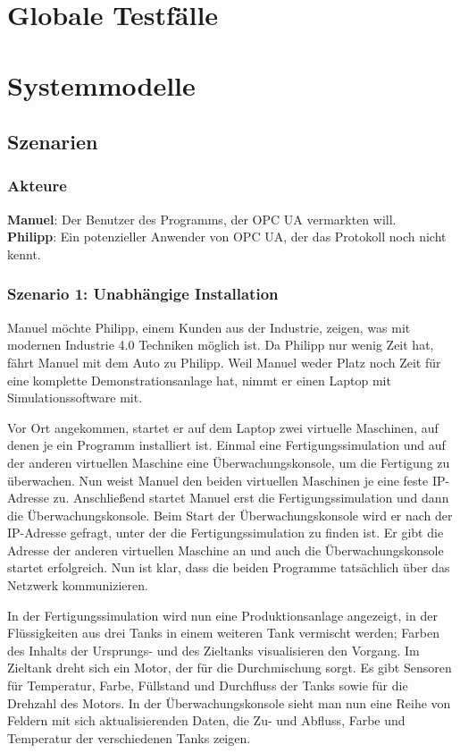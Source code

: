 \documentclass[parskip=full]{scrartcl}
\begin{document}
\pagebreak
\section{Globale Testfälle}
\Blindtext[1]

\pagebreak
\section{Systemmodelle}
\subsection{Szenarien}
\subsubsection*{Akteure}
\textbf{Manuel}: Der Benutzer des Programms, der OPC UA vermarkten will.\\
\textbf{Philipp}: Ein potenzieller Anwender von OPC UA, der das Protokoll noch nicht kennt.

\subsubsection{Szenario 1: Unabhängige Installation}
Manuel möchte Philipp, einem Kunden aus der Industrie, zeigen, was mit modernen Industrie 4.0 Techniken möglich ist.
Da Philipp nur wenig Zeit hat, fährt Manuel mit dem Auto zu Philipp. Weil Manuel weder Platz 
noch Zeit für eine komplette Demonstrationsanlage hat, nimmt er einen Laptop mit Simulationssoftware mit.

Vor Ort angekommen, startet er auf dem Laptop zwei virtuelle Maschinen, auf denen je ein Programm installiert ist. 
Einmal eine Fertigungssimulation und auf der anderen virtuellen Maschine eine Überwachungskonsole, um die Fertigung zu überwachen.
Nun weist Manuel den beiden virtuellen Maschinen je eine feste IP-Adresse zu.
Anschlie{\ss}end startet Manuel erst die Fertigungssimulation und dann die Überwachungskonsole.
Beim Start der Überwachungskonsole wird er nach der IP-Adresse gefragt, unter der die Fertigungssimulation zu finden ist. 
Er gibt die Adresse der anderen virtuellen Maschine an und auch die Überwachungskonsole startet erfolgreich. 
Nun ist klar, dass die beiden Programme tatsächlich über das Netzwerk kommunizieren.

In der Fertigungssimulation wird nun eine Produktionsanlage angezeigt, in der Flüssigkeiten aus drei Tanks
in einem weiteren Tank vermischt werden; Farben des Inhalts der Ursprungs- und des Zieltanks visualisieren den Vorgang. 
Im Zieltank dreht sich ein Motor, der für die Durchmischung sorgt.
Es gibt Sensoren für Temperatur, Farbe, Füllstand und Durchfluss der Tanks sowie für die Drehzahl des Motors.
In der Überwachungskonsole sieht man nun eine Reihe von Feldern mit sich aktualisierenden Daten,
die Zu- und Abfluss, Farbe und Temperatur der verschiedenen Tanks zeigen.
\end{document}
